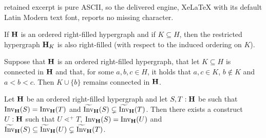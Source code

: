 \documentclass[10pt,a4paper]{amsart}
\newcommand{\Invt}{\widetilde{\mathrm{Inv}}}
\newcommand{\Inv}{{\mathrm{Inv}}}
\newcommand{\inc}{\subseteq}
\begin{document}
retained excerpt is pure ASCII, so the delivered engine, XeLaTeX with its default Latin Modern text font, reports no missing character.
\begin{lemma}\label{s000}
If ${\bf H}$ is an ordered right-filled hypergraph and if $K\subseteq H$, then the restricted hypergraph ${\bf H}_{K}$ is also right-filled (with respect to the induced ordering on $K$).
\end{lemma}

\begin{lemma}\label{s00}
Suppose that ${\bf H}$ is an ordered right-filled hypergraph, that let $K\inc H$ is connected in ${\bf H}$ and that, for some $a,b,c\in H$, it holds that $a,c\in K$, $b\not\in K$ and $a<b<c$. Then $K\cup \{b\}$ remains connected in ${\bf H}$.
\end{lemma}

\begin{lemma}\label{s14}
Let ${\bf H}$ be an ordered right-filled hypergraph and let $S,T:{\bf H}$ be such that $\Inv_{\bf H}(S)= \Inv_{\bf H}(T)$ and $\Invt_{\bf H}(S)\subsetneq \Invt_{\bf H}(T)$. Then there exists a construct $U:{\bf H}$ such that $U\lessdot^+ T$, $\Inv_{\bf H}(S)= \Inv_{\bf H}(U)$ and $\Invt_{\bf H}(S)\subseteq\Invt_{\bf H}(U)\subsetneq \Invt_{\bf H}(T)$. 
\end{lemma}
\end{document}
